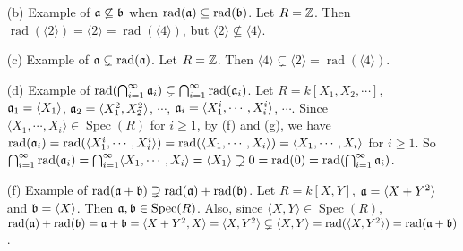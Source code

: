 \begin{example}\label{1.59}
    \begin{enumerate}
        \item[(b)] Example of $\mathfrak{a} \not \subseteq \mathfrak{b}$ when $\operatorname{rad}(\mathfrak{a}) \subseteq \operatorname{rad}(\mathfrak{b})$. Let $R = \mathbb{Z}$. Then $\operatorname{rad}(\langle 2 \rangle) = \langle 2 \rangle = \operatorname{rad}(\langle 4 \rangle)$, but $\langle 2 \rangle \not \subseteq \langle 4 \rangle$.
        \item[(c)]
            Example of $\mathfrak{a} \subsetneq \operatorname{rad}(\mathfrak{a})$. Let $R = \mathbb{Z}$. Then $\langle 4 \rangle \subsetneq \langle 2 \rangle = \operatorname{rad}(\langle 4 \rangle)$.
        \item[(d)] Example of $\operatorname{rad}(\bigcap_{i=1}^\infty \mathfrak{a}_i) \subsetneq \bigcap_{i=1}^\infty \operatorname{rad}(\mathfrak{a}_i)$. Let $R = k[X_1,X_2,\cdots]$, $\mathfrak{a}_1 = \langle X_1 \rangle$, $\mathfrak{a}_2 = \langle X_1^2,X_2^2 \rangle$, $\cdots$, $\mathfrak{a}_i = \langle X_1^i,\cdots,X_i^i \rangle$, $\cdots$. Since $\langle X_1,\cdots,X_i \rangle \in \operatorname{Spec}(R)$ for $i \geq 1$, by (f) and (g), we have $\operatorname{rad}(\mathfrak{a}_i) = \operatorname{rad}(\langle X_1^i,\cdots,X_i^i \rangle) = \operatorname{rad}(\langle X_1,\cdots,X_i \rangle) = \langle X_1,\cdots,X_i \rangle$ for $i \geq 1$. So $\bigcap_{i=1}^\infty \operatorname{rad}(\mathfrak{a}_i) = \bigcap_{i=1}^\infty \langle X_1,\cdots,X_i \rangle = \langle X_1 \rangle \supsetneq 0 = \operatorname{rad}(0) = \operatorname{rad}(\bigcap_{i=1}^\infty \mathfrak{a}_i)$. 
        \item[(f)] Example of $\operatorname{rad}(\mathfrak{a} + \mathfrak{b}) \supsetneq \operatorname{rad}(\mathfrak{a}) + \operatorname{rad}(\mathfrak{b})$. Let $R = k[X,Y]$, $\mathfrak{a} = \langle X+Y^2 \rangle$ and $\mathfrak{b} = \langle X \rangle$. Then $\mathfrak{a},\mathfrak{b} \in \operatorname{Spec}(R)$. Also, since $\langle X,Y \rangle \in \operatorname{Spec}(R)$, $\operatorname{rad}(\mathfrak{a}) + \operatorname{rad}(\mathfrak{b}) = \mathfrak{a} + \mathfrak{b} = \langle X+Y^2,X \rangle = \langle X,Y^2 \rangle \subsetneq \langle X,Y \rangle = \operatorname{rad}(\langle X,Y^2 \rangle) = \operatorname{rad}(\mathfrak{a} + \mathfrak{b})$.
    \end{enumerate}
\end{example}

